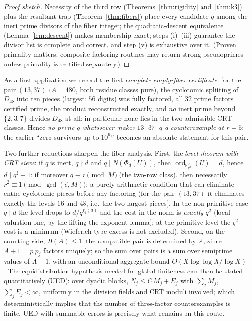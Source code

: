 \documentclass[11pt]{amsart}
\theoremstyle{definition}
\theoremstyle{remark}
\newcommand{\F}{\mathbb{F}}
\newcommand{\ord}{\operatorname{ord}}
\begin{document}
\begin{proof}[Proof sketch]
Necessity of the third row (Theorems~\ref{thm:rigidity}
and~\ref{thm:k3}) plus the resultant trap
(Theorem~\ref{thm:fibers}) place every candidate $q$ among the inert
prime divisors of the fiber integer; the quadratic-descent equivalence
(Lemma~\ref{lem:descent}) makes membership exact; steps (i)--(iii)
guarantee the divisor list is complete and correct, and step (v) is
exhaustive over it. (Proven primality matters: composite-factoring
routines may return strong pseudoprimes unless primality is certified
separately.)
\end{proof}

As a first application we record the first \emph{complete empty-fiber
certificate}: for the pair $(13, 37)$ ($A = 480$, both residue classes
pure), the cyclotomic splitting of $D_{48}$ into ten pieces (largest:
$56$ digits) was fully factored, all $32$ prime factors certified prime,
the product reconstructed exactly, and \emph{no} inert prime beyond
$\{2, 3, 7\}$ divides $D_{48}$ at all; in particular none lies in the
two admissible CRT classes. Hence \emph{no prime $q$ whatsoever makes
$13 \cdot 37 \cdot q$ a counterexample at $r = 5$}: the earlier
``zero survivors up to $10^9$'' becomes an absolute statement for this
pair.

Two further reductions sharpen the fiber analysis. First, the
\emph{level theorem with CRT sieve}: if $q$ is inert, $q \nmid d$ and
$q \mid N(\Phi_d(U))$, then $\ord_{\F_{q^2}^\times}(U) = d$, hence
$d \mid q^2 - 1$; if moreover $q \equiv r \pmod M$ (the two-row class),
then necessarily $r^2 \equiv 1 \pmod{\gcd(d, M)}$; a purely
arithmetic condition that can eliminate entire cyclotomic pieces before
any factoring (for the pair $(13,37)$ it eliminates exactly the levels
$16$ and $48$, i.e.\ the two largest pieces). In the non-primitive case
$q \mid d$ the level drops to $d/q^{v_q(d)}$ and the cost in the norm is
\emph{exactly} $q^2$ (local valuation one, by the lifting-the-exponent
lemma); at the primitive level the $q^2$ cost is a minimum
(Wieferich-type excess is not excluded). Second, on the counting side,
$B(A) \le 1$: the compatible pair is determined by $A$, since
$A + 1 = p_ip_j$ factors uniquely; so the sum over pairs is a sum
over semiprime values of $A+1$, with an unconditional aggregate bound
$O(X \log\log X/\log X)$. The equidistribution hypothesis needed for
global finiteness can then be stated quantitatively (UED): over dyadic
blocks, $N_j \le C\,M_j + E_j$ with $\sum_j M_j$, $\sum_j E_j < \infty$,
uniformly in the division fields and CRT moduli involved; which
deterministically implies that the number of three-factor
counterexamples is finite. UED with summable errors is precisely what
remains on this route.
\end{document}
